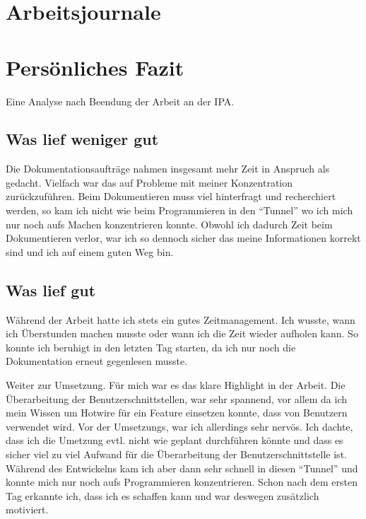 

\chapter{Arbeitsjournale}













\chapter{Persönliches Fazit}
Eine Analyse nach Beendung der Arbeit an der IPA.

\section{Was lief weniger gut}
Die Dokumentationsaufträge nahmen insgesamt mehr Zeit in Anspruch als gedacht. Vielfach war das auf Probleme mit meiner Konzentration zurückzuführen.
Beim Dokumentieren muss viel hinterfragt und recherchiert werden, so kam ich nicht wie beim Programmieren in den ``Tunnel'' wo ich mich nur noch aufs Machen konzentrieren konnte.
Obwohl ich dadurch Zeit beim Dokumentieren verlor, war ich so dennoch sicher das meine Informationen korrekt sind und ich auf einem guten Weg bin.

\section{Was lief gut}
Während der Arbeit hatte ich stets ein gutes Zeitmanagement. Ich wusste, wann ich Überstunden machen musste oder wann ich die Zeit
wieder aufholen kann. So konnte ich beruhigt in den letzten Tag starten, da ich nur noch die Dokumentation erneut gegenlesen musste.

Weiter zur Umsetzung. Für mich war es das klare Highlight in der Arbeit. Die Überarbeitung der Benutzerschnittstellen, war sehr spannend,
vor allem da ich mein Wissen um Hotwire für ein Feature einsetzen konnte, dass von Benutzern verwendet wird. Vor der Umsetzungs, war ich allerdings sehr nervös.
Ich dachte, dass ich die Umetzung evtl. nicht wie geplant durchführen könnte und dass es sicher viel zu viel Aufwand für die Überarbeitung der Benutzerschnittstelle ist.
Während des Entwickelns kam ich aber dann sehr schnell in diesen ``Tunnel'' und konnte mich nur noch aufs Programmieren konzentrieren. Schon nach dem ersten Tag erkannte ich,
dass ich es schaffen kann und war deswegen zusätzlich motiviert.

